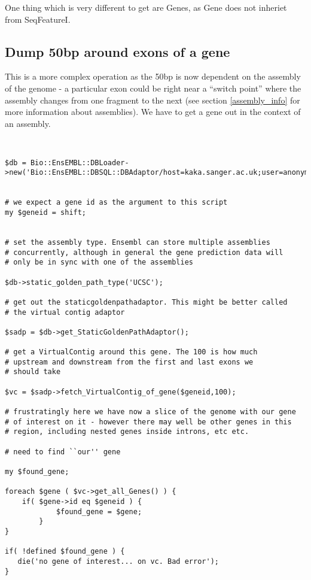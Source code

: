 \documentclass[11pt,a4paper]{article}
\begin{document}
One thing which is very different to get are Genes, as Gene does
not inheriet from SeqFeatureI.


\subsection{Dump 50bp around exons of a gene}

This is a more complex operation as the 50bp is now dependent on the
assembly of the genome - a particular exon could be right near a
``switch point'' where the assembly changes from one fragment to the
next (see section \ref{assembly_info} for more information about
assemblies). We have to get a gene out in the context of an assembly.



\begin{verbatim}


$db = Bio::EnsEMBL::DBLoader->new('Bio::EnsEMBL::DBSQL::DBAdaptor/host=kaka.sanger.ac.uk;user=anonymous;dbname=current');


# we expect a gene id as the argument to this script
my $geneid = shift;


# set the assembly type. Ensembl can store multiple assemblies
# concurrently, although in general the gene prediction data will
# only be in sync with one of the assemblies

$db->static_golden_path_type('UCSC');

# get out the staticgoldenpathadaptor. This might be better called
# the virtual contig adaptor

$sadp = $db->get_StaticGoldenPathAdaptor();

# get a VirtualContig around this gene. The 100 is how much
# upstream and downstream from the first and last exons we
# should take

$vc = $sadp->fetch_VirtualContig_of_gene($geneid,100);

# frustratingly here we have now a slice of the genome with our gene
# of interest on it - however there may well be other genes in this
# region, including nested genes inside introns, etc etc.

# need to find ``our'' gene

my $found_gene;

foreach $gene ( $vc->get_all_Genes() ) {
	if( $gene->id eq $geneid ) {
            $found_gene = $gene;
        }
}

if( !defined $found_gene ) {
   die('no gene of interest... on vc. Bad error');
}


\end{verbatim}
\end{document}
